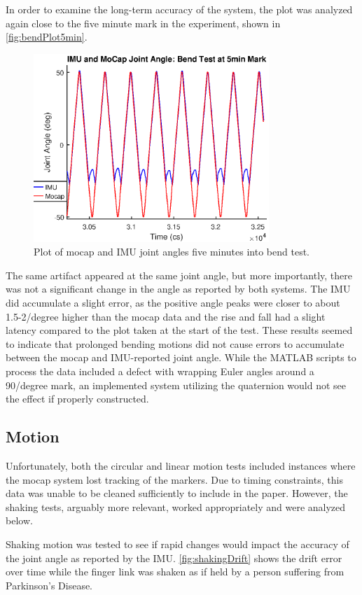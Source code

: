 \documentclass[letterpaper, 10 pt, conference]{ieeeconf}  %
\begin{document}
In order to examine the long-term accuracy of the system, the plot was analyzed again close to the five minute mark in the experiment, shown in \autoref{fig:bendPlot5min}.

\begin{figure}[thpb]
	\centering
	\includegraphics[width = 3.5in]{finger_bend_imuANDmocap.eps}
    \caption{Plot of mocap and IMU joint angles five minutes into bend test.}
    \label{fig:bendPlot5min}
\end{figure}

The same artifact appeared at the same joint angle, but more importantly, there was not a significant change in the angle as reported by both systems. The IMU did accumulate a slight error, as the positive angle peaks were closer to about 1.5-2/degree higher than the mocap data and the rise and fall had a slight latency compared to the plot taken at the start of the test. These results seemed to indicate that prolonged bending motions did not cause errors to accumulate between the mocap and IMU-reported joint angle. While the MATLAB scripts to process the data included a defect with wrapping Euler angles around a 90/degree mark, an implemented system utilizing the quaternion would not see the effect if properly constructed.

\subsection{Motion}
Unfortunately, both the circular and linear motion tests included instances where the mocap system lost tracking of the markers. Due to timing constraints, this data was unable to be cleaned sufficiently to include in the paper. However, the shaking tests, arguably more relevant, worked appropriately and were analyzed below.

Shaking motion was tested to see if rapid changes would impact the accuracy of the joint angle as reported by the IMU. \autoref{fig:shakingDrift} shows the drift error over time while the finger link was shaken as if held by a person suffering from Parkinson's Disease.
\end{document}
